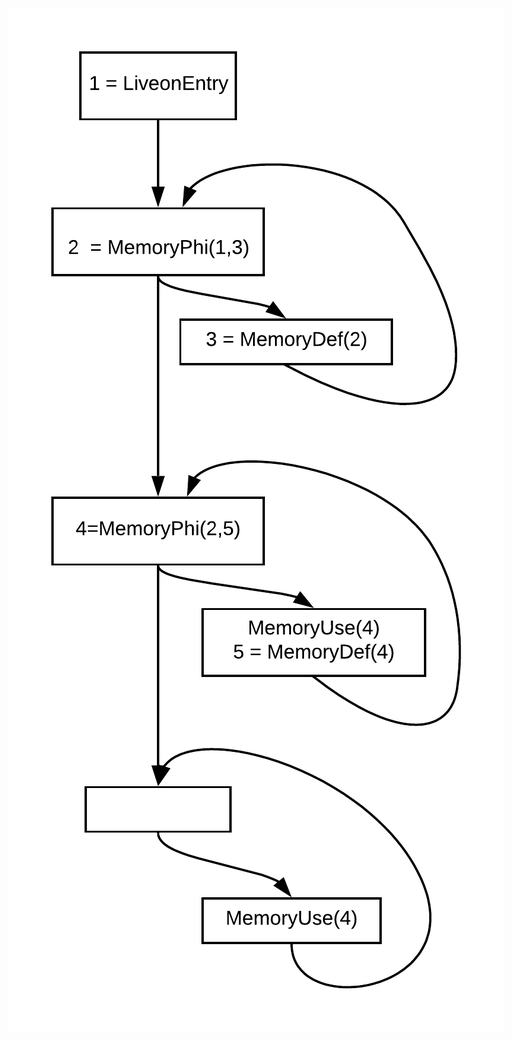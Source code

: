 \begin{minipage}{.5\textwidth}
\includegraphics[scale=0.6]{images/memorySSa-impl.png}
\label{memorySSa-impl}
\end{minipage}

